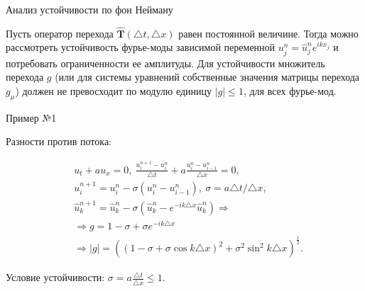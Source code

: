 \documentclass[10pt,xcolor=pst,aspectratio=169]{beamer}
\begin{document}
\begin{frame}{Анализ устойчивости по фон Нейману}

	\transdissolve[duration=0.1]
	\justifying
	\large

	Пусть оператор перехода $\hat{\textbf{T}} (\triangle t, \triangle x)$ равен постоянной величине. Тогда можно рассмотреть устойчивость фурье-моды зависимой переменной $u^{n}_{j} = \hat{u}^{n}_{j} e^{i k x_{j}}$ и потребовать ограниченности ее амплитуды. Для устойчивости множитель перехода $g$ (или для системы уравнений собственные значения матрицы перехода $g_{\mu}$) должен не превосходит по модулю единицу $\vert g \vert \leq 1$, для всех фурье-мод.\\

\end{frame}

\begin{frame}{Пример №1}

	\transdissolve[duration=0.1]
	\justifying
	\large

	Разности против потока:

	\[
		\begin{split}
			&u_{t} + a u_{x} = 0 , \: \frac{u^{n + 1}_{i} - u^{n}_{i}}{\triangle t} + a \frac{u^{n}_{i} - u^{n}_{i - 1}}{\triangle x} = 0 , \\
			&u^{n + 1}_{i} = u^{n}_{i} - \sigma \left( u^{n}_{i} - u^{n}_{i - 1} \right) , \: \sigma = a \triangle t / \triangle x , \\
			&\hat{u}^{n + 1}_{k} = \hat{u}^{n}_{k} - \sigma \left( \hat{u}^{n}_{k} - e^{- i k \triangle x} \hat{u}^{n}_{k} \right) \Rightarrow \\
			& \Rightarrow g = 1 - \sigma + \sigma e^{- i k \triangle x} \\
			& \Rightarrow |g| = \left( \left( 1 - \sigma + \sigma \cos k \triangle x \right)^{2} + \sigma^2 \sin^{2} k \triangle x \right)^{\frac{1}{2}}.
		\end{split}
	\]

    Условие устойчивости: $\sigma = a \frac{\triangle t}{\triangle x} \leq 1$.\\

\end{frame}
\end{document}

